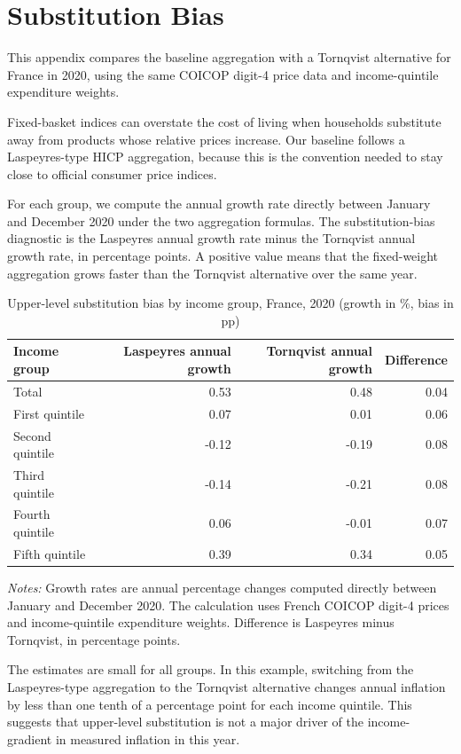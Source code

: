 \section{Substitution Bias}
\label{app:substitution-bias}

This appendix
compares the baseline aggregation with a Tornqvist alternative for France in
2020, using the same COICOP digit-4 price data and income-quintile expenditure
weights.

Fixed-basket indices can overstate the cost of living when households substitute
away from products whose relative prices increase. Our baseline follows a
Laspeyres-type HICP aggregation, because this is the convention needed to stay
close to official consumer price indices. 

For each group, we compute the annual
growth rate directly between January and December 2020 under the two aggregation
formulas. The substitution-bias diagnostic is the Laspeyres annual growth rate
minus the Tornqvist annual growth rate, in percentage points. A positive value
means that the fixed-weight aggregation grows faster than the Tornqvist
alternative over the same year.

\begin{table}[H]
\centering
\caption{Upper-level substitution bias by income group, France, 2020 (growth in \%, bias in pp)}
\label{tab:fr-substitution-bias}
\small
\begin{tabular}{lrrr}
\toprule
Income group & Laspeyres annual growth & Tornqvist annual growth & Difference \\
\midrule
Total & 0.53 & 0.48 & 0.04 \\
First quintile & 0.07 & 0.01 & 0.06 \\
Second quintile & -0.12 & -0.19 & 0.08 \\
Third quintile & -0.14 & -0.21 & 0.08 \\
Fourth quintile & 0.06 & -0.01 & 0.07 \\
Fifth quintile & 0.39 & 0.34 & 0.05 \\
\bottomrule
\end{tabular}
\begin{minipage}{0.88\textwidth}
\footnotesize
\emph{Notes:} Growth rates are annual percentage changes computed directly
between January and December 2020. The calculation uses French COICOP digit-4
prices and income-quintile expenditure weights. Difference is Laspeyres minus
Tornqvist, in percentage points.
\end{minipage}
\end{table}

The estimates are small for all groups. In this example, switching from the
Laspeyres-type aggregation to the Tornqvist alternative changes annual
inflation by less than one tenth of a percentage point for each income quintile.
This suggests that upper-level substitution is not a major driver of the
income-gradient in measured inflation in this year.

